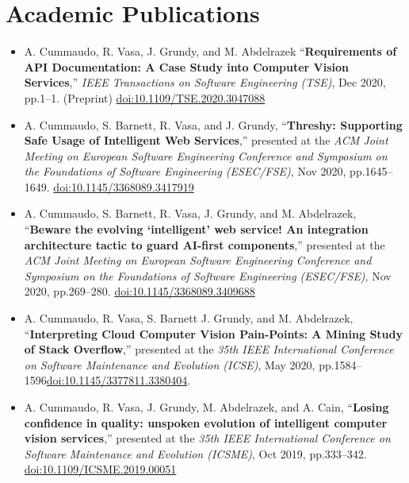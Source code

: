\section{Academic Publications}

\medskip
{
\footnotesize
\begin{itemize}
  \itemsep-1.5em
  \item A. Cummaudo, R. Vasa, J. Grundy, and M. Abdelrazek ``\textbf{Requirements of API Documentation: A Case Study into Computer Vision Services},''  \textit{IEEE Transactions on Software Engineering (TSE)}, Dec 2020, pp.1--1. (Preprint) \href{https://doi.org/10.1109/TSE.2020.3047088}{doi:10.1109/TSE.2020.3047088}\\
  \item A. Cummaudo, S. Barnett, R. Vasa, and J. Grundy, ``\textbf{Threshy: Supporting Safe Usage of Intelligent Web Services},'' presented at the \textit{ACM Joint Meeting on European Software Engineering Conference and Symposium on the Foundations of Software Engineering (ESEC/FSE)}, Nov 2020, pp.1645--1649. \href{https://doi.org/10.1145/3368089.3417919}{doi:10.1145/3368089.3417919}\\
  \item A. Cummaudo, S. Barnett, R. Vasa, J. Grundy, and M. Abdelrazek, ``\textbf{Beware the evolving `intelligent' web service! An integration architecture tactic to guard AI-first components},'' presented at the \textit{ACM Joint Meeting on European Software Engineering Conference and Symposium on the Foundations of Software Engineering (ESEC/FSE)}, Nov 2020, pp.269--280. \href{https://doi.org/10.1145/3368089.3409688}{doi:10.1145/3368089.3409688}\\
  \item A. Cummaudo, R. Vasa, S. Barnett J. Grundy, and M. Abdelrazek, ``\textbf{Interpreting Cloud Computer Vision Pain-Points: A Mining Study of Stack Overflow},'' presented at the \textit{35th IEEE International Conference on Software Maintenance and Evolution (ICSE)}, May 2020, pp.1584--1596\href{https://doi.org/10.1145/3377811.3380404}{doi:10.1145/3377811.3380404}.\\
  \item A. Cummaudo, R. Vasa, J. Grundy, M. Abdelrazek, and A. Cain, ``\textbf{Losing confidence in quality: unspoken evolution of intelligent computer vision services},'' presented at the \textit{35th IEEE International Conference on Software Maintenance and Evolution (ICSME)}, Oct 2019, pp.333--342. \href{https://doi.org/10.1109/ICSME.2019.00051}{doi:10.1109/ICSME.2019.00051}\\

\end{itemize}}
